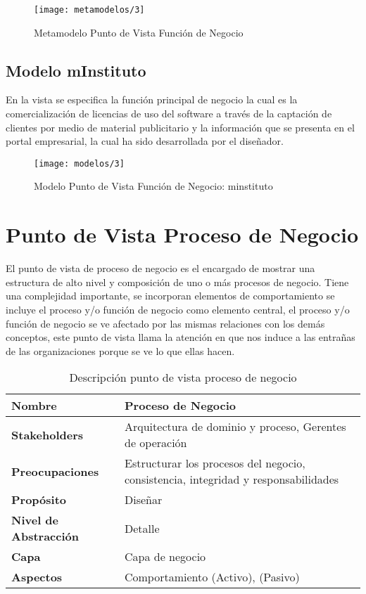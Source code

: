    \begin{figure}[H]
   	\centering
   	\texttt{[image: metamodelos/3]}
   	\captionsetup{width=.95\textwidth}
   	\caption{Metamodelo Punto de Vista Función de Negocio}
   	\label{metamodelo3}
   \end{figure}
    
    \subsection{Modelo mInstituto}
    En la vista se especifica la función principal de negocio la cual es la comercialización de licencias de uso del software a través de la captación de clientes por medio de material publicitario y la información que se presenta en el portal empresarial, la cual ha sido desarrollada por el diseñador.
    
    \begin{figure}[H]
    	\centering
    	\texttt{[image: modelos/3]}
    	\captionsetup{width=.95\textwidth}
    	\caption{Modelo Punto de Vista Función de Negocio: minstituto}
    	\label{modelo3}
    \end{figure}

  \section{Punto de Vista Proceso de Negocio}
  El punto de vista de proceso de negocio es el encargado de mostrar una estructura de alto nivel y composición de uno o más procesos de negocio. Tiene una complejidad importante, se incorporan elementos de comportamiento se incluye el proceso y/o función de negocio como elemento central, el proceso y/o función de negocio se ve afectado por las mismas relaciones con los demás conceptos, este punto de vista llama la atención en que nos induce a las entrañas de las organizaciones porque se ve lo que ellas hacen.
  
  \begin{table}[H]
  	\centering
  	\begin{tabular}{lp{8cm}}
  		\toprule
  		\textbf{Nombre} & \textbf{Proceso de Negocio} \\
  		\midrule
  		\textbf{Stakeholders} & Arquitectura de dominio y proceso, Gerentes de operación \\
  		\textbf{Preocupaciones} & Estructurar los procesos del negocio, consistencia, integridad y responsabilidades \\
  		\textbf{Propósito} & Diseñar \\
  		\textbf{Nivel de Abstracción} & Detalle \\
  		\textbf{Capa} & Capa de negocio \\
  		\textbf{Aspectos} & Comportamiento (Activo), (Pasivo) \\
  		\bottomrule
  	\end{tabular}
  	\captionsetup{width=.95\textwidth}
  	\caption{Descripción punto de vista proceso de negocio}
  	\label{Tab:tabla7}
  \end{table}
  
